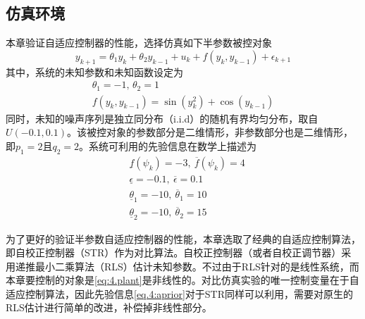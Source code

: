 \subsection{仿真环境}\label{sect:4.4.1}
本章验证自适应控制器的性能，选择仿真如下半参数被控对象
\begin{equation}\label{eq:4.plant}
y_{k+1} = \theta_{1}y_{k} + \theta_{2}y_{k-1} + u_{k} + f(y_{k},y_{k-1}) + \epsilon_{k+1} 
\end{equation}
其中，系统的未知参数和未知函数设定为
\begin{equation}
\begin{array}{c}
\theta_{1} = -1\textbf{, }\theta_{2} = 1\\
f(y_{k},y_{k-1}) = \sin(y_{k}^{2}) + \cos(y_{k-1})
\end{array}
\end{equation}
同时，未知的噪声序列是独立同分布（i.i.d）的随机有界均匀分布，取自$U(-0.1,0.1)$。该被控对象的参数部分是二维情形，非参数部分也是二维情形，即$p_{1}=2$且$q_{2}=2$。系统可利用的先验信息在数学上描述为
\begin{equation}\label{eq.4:aprior}
\begin{split}
&\underline{f}(\psi_{k})=-3,\ \overline{f}(\psi_{k})=4\\
&\underline{\epsilon}=-0.1,\ \overline{\epsilon}=0.1\\
&\underline{\theta}_{1}=-10,\ \overline{\theta}_{1}=10\\
&\underline{\theta}_{2}=-10,\ \overline{\theta}_{2}=15
\end{split}
\end{equation}

为了更好的验证半参数自适应控制器的性能，本章选取了经典的自适应控制算法，即自校正控制器（STR）作为对比算法。自校正控制器（或者自校正调节器）采用递推最小二乘算法（RLS）估计未知参数。不过由于RLS针对的是线性系统，而本章要控制的对象是\eqref{eq:4.plant}是非线性的。对比仿真实验的唯一控制变量在于自适应控制算法，因此先验信息\eqref{eq.4:aprior}对于STR同样可以利用，需要对原生的RLS估计进行简单的改进，补偿掉非线性部分。

